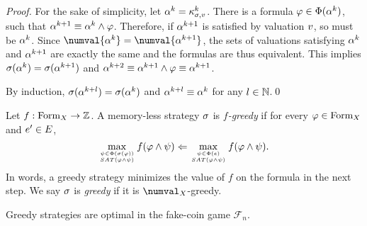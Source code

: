 \begin{proof}
For the sake of simplicity, let $\alpha^k = \kappa_{\sigma, v}^{k}$.
There is a formula $\varphi\in\Phi(\alpha^k)$,
  such that $\alpha^{k+1} \equiv \alpha^{k} \wedge \varphi$.
Therefore, if $\alpha^{k+1}$ is satisfied by valuation $v$, so must be $\alpha^{k}$.
Since $\numval{\know^{k}} = \numval{\know^{k+1}}$, the sets of
  valuations satisfying $\alpha^{k}$ and $\alpha^{k+1}$ are exactly the same
  and the formulas are thus equivalent.
This implies $\sigma(\alpha^{k}) = \sigma(\alpha^{k+1})$ and $\alpha^{k+2} \equiv \alpha^{k+1}\wedge \varphi \equiv \alpha^{k+1}$.

By induction,
  $\sigma(\alpha^{k+l}) = \sigma(\alpha^{k})$ and
  $\alpha^{k+l} \equiv \alpha^{k}$
  for any $l\in\mathbb{N}$.\qed
\end{proof}

\begin{definition}
Let $f: \textrm{Form}_X -> \mathbb{Z}$.
A memory-less strategy $\sigma$ is \emph{$f$-greedy} if
  for every $\varphi\in\textrm{Form}_X$ and $e'\in E$,
\[
\max_{\psi \in \Phi(\sigma(\varphi)) \atop SAT(\varphi\wedge\psi)} f(\varphi\wedge\psi) <=
\max_{\psi \in \Phi(e) \atop SAT(\varphi\wedge\psi)} f(\varphi\wedge\psi).
\]
In words, a greedy strategy minimizes
  the value of $f$ on the formula in the next step.
We say $\sigma$ is \emph{greedy} if it is $\numval_\Var{}$-greedy.
\end{definition}

\begin{example}
Greedy strategies are optimal in the fake-coin game $\mathcal{F}_n$.
\end{example}



